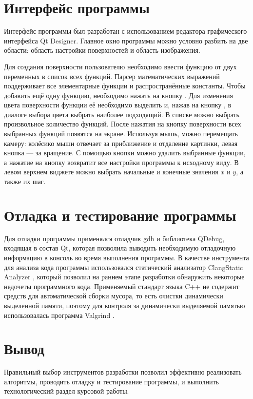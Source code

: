 
\section{Интерфейс программы}

Интерфейс программы был разработан с использованием редактора графического интерфейса Qt Designer.
Главное окно программы можно условно разбить на две области: область настройки поверхностей и область изображения.


Для создания поверхности пользователю необходимо ввести функцию от двух переменных в список всех функций.
Парсер математических выражений поддерживает все элементарные функции и распространённые константы.
Чтобы добавить ещё одну функцию, необходимо нажать на кнопку .
Для изменения цвета поверхности функции её необходимо выделить и, нажав на кнопку , в диалоге выбора цвета выбрать наиболее подходящий.
В списке можно выбрать произвольное количество функций.
После нажатия на кнопку  поверхности всех выбранных функций появятся на экране.
Используя мышь, можно перемещать камеру: колёсико мыши отвечает за приближение и отдаление картинки, левая кнопка — за вращение.
С помощью кнопки  можно удалить выбранные функции, а нажатие на кнопку  возвратит все настройки программы к исходному виду.
В левом верхнем виджете можно выбрать начальные и конечные значения $x$ и $y$, а также их шаг.


\section{Отладка и тестирование программы}

Для отладки программы применялся отладчик gdb и библиотека QDebug, входящая в состав Qt, которая позволила выводить необходимую отладочную информацию в консоль во время выполнения программы.
В качестве инструмента для анализа кода программы использовался статический анализатор ClangStatic Analyzer \cite{clang}, который позволил на раннем этапе разработки обнаружить некоторые недочеты программного кода.
Применяемый стандарт языка C++ не содержит средств для автоматической сборки мусора, то есть очистки динамически выделенной памяти, поэтому для контроля за динамически выделяемой памятью использовалась программа Valgrind \cite{valgrind}.

\section*{Вывод}

Правильный выбор инструментов разработки позволил эффективно реализовать алгоритмы, проводить отладку и тестирование программы, и выполнить технологический раздел курсовой работы.
